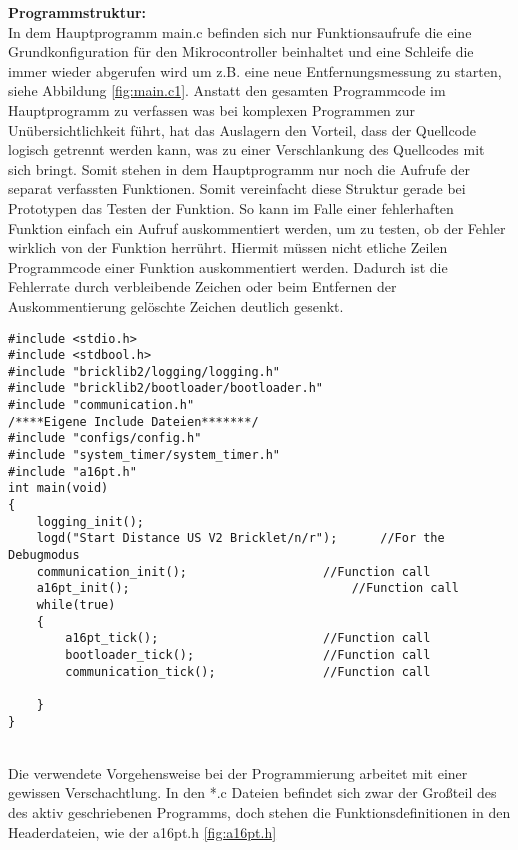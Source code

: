 \textbf{Programmstruktur:}\\
In dem Hauptprogramm main.c befinden sich nur Funktionsaufrufe die eine Grundkonfiguration  für den Mikrocontroller beinhaltet und eine Schleife die immer wieder abgerufen wird um z.B. eine neue Entfernungsmessung zu starten, siehe Abbildung \ref{fig:main.c1}. Anstatt den gesamten Programmcode im Hauptprogramm zu verfassen was bei komplexen Programmen zur Unübersichtlichkeit führt, hat das Auslagern den Vorteil, dass der Quellcode logisch getrennt werden kann, was zu einer Verschlankung des Quellcodes mit sich bringt. Somit stehen in dem Hauptprogramm nur noch die Aufrufe der separat verfassten Funktionen. Somit vereinfacht diese Struktur gerade bei Prototypen das Testen der Funktion. So kann im Falle einer fehlerhaften Funktion einfach ein Aufruf auskommentiert werden, um zu testen, ob der Fehler wirklich von der Funktion herrührt. Hiermit müssen nicht etliche Zeilen Programmcode einer Funktion auskommentiert werden. Dadurch ist die Fehlerrate durch verbleibende Zeichen oder beim Entfernen der Auskommentierung gelöschte Zeichen deutlich gesenkt.\\
\begin{minipage}{1\textwidth}
\begin{lstlisting}
#include <stdio.h>
#include <stdbool.h>
#include "bricklib2/logging/logging.h"
#include "bricklib2/bootloader/bootloader.h"
#include "communication.h"
/****Eigene Include Dateien*******/
#include "configs/config.h"
#include "system_timer/system_timer.h"
#include "a16pt.h"
int main(void)
{ 
	logging_init(); 
	logd("Start Distance US V2 Bricklet/n/r");  	//For the Debugmodus
	communication_init(); 					//Function call
	a16pt_init(); 								//Function call	
	while(true)
	{
		a16pt_tick(); 						//Function call
		bootloader_tick(); 					//Function call
		communication_tick(); 				//Function call
		
	}
}
\end{lstlisting}
\label{fig:main.c1}
\end{minipage}\\
Die verwendete Vorgehensweise bei der Programmierung arbeitet mit einer gewissen Verschachtlung. In den *.c Dateien befindet sich zwar der Großteil des des aktiv geschriebenen Programms, doch stehen die Funktionsdefinitionen in den Headerdateien, wie der a16pt.h \ref{fig:a16pt.h}\\
